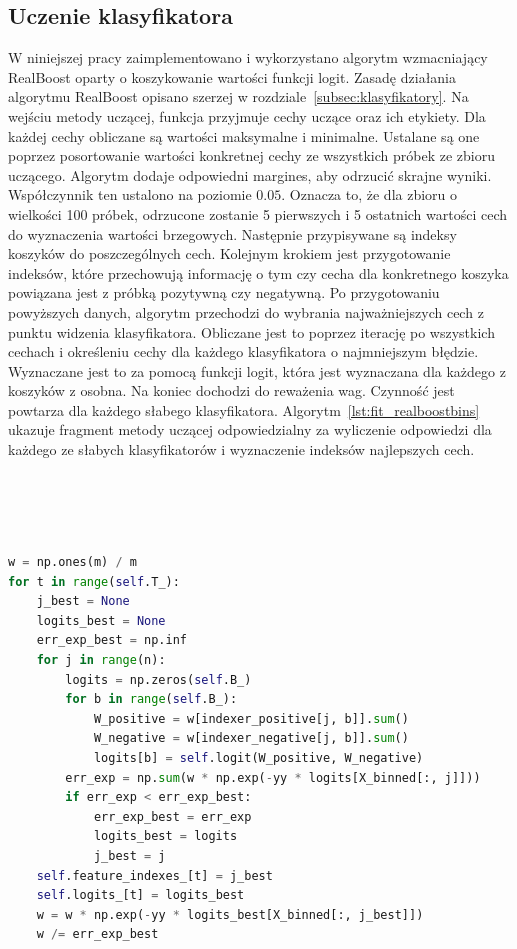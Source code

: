 \subsection{Uczenie klasyfikatora}
W niniejszej pracy zaimplementowano i wykorzystano algorytm wzmacniający RealBoost oparty o koszykowanie wartości funkcji logit.
Zasadę działania algorytmu RealBoost opisano szerzej w rozdziale~\ref{subsec:klasyfikatory}.
Na wejściu metody uczącej, funkcja przyjmuje cechy uczące oraz ich etykiety.
Dla każdej cechy obliczane są wartości maksymalne i minimalne.
Ustalane są one poprzez posortowanie wartości konkretnej cechy ze wszystkich próbek ze zbioru uczącego.
Algorytm dodaje odpowiedni margines, aby odrzucić skrajne wyniki.
Współczynnik ten ustalono na poziomie $0.05$.
Oznacza to, że dla zbioru o wielkości 100 próbek, odrzucone zostanie 5 pierwszych i 5 ostatnich wartości cech do wyznaczenia wartości brzegowych.
Następnie przypisywane są indeksy koszyków do poszczególnych cech.
Kolejnym krokiem jest przygotowanie indeksów, które przechowują informację o tym czy cecha dla konkretnego koszyka powiązana jest z próbką pozytywną czy negatywną.
Po przygotowaniu powyższych danych, algorytm przechodzi do wybrania najważniejszych cech z punktu widzenia klasyfikatora.
Obliczane jest to poprzez iterację po wszystkich cechach i określeniu cechy dla każdego klasyfikatora o najmniejszym błędzie.
Wyznaczane jest to za pomocą funkcji logit, która jest wyznaczana dla każdego z koszyków \linebreak z osobna.
Na koniec dochodzi do reważenia wag.
Czynność jest powtarza dla każdego słabego klasyfikatora.
Algorytm~\ref{lst:fit_realboostbins} ukazuje fragment metody uczącej odpowiedzialny za wyliczenie odpowiedzi dla każdego ze słabych klasyfikatorów i wyznaczenie indeksów najlepszych cech.\\\\\\\\\\
\begin{lstlisting}[language=Python, caption=Procedura ucząca klasyfikator RealBoostBins., label={lst:fit_realboostbins}]
w = np.ones(m) / m
for t in range(self.T_):
    j_best = None
    logits_best = None
    err_exp_best = np.inf
    for j in range(n):
        logits = np.zeros(self.B_)
        for b in range(self.B_):
            W_positive = w[indexer_positive[j, b]].sum()
            W_negative = w[indexer_negative[j, b]].sum()
            logits[b] = self.logit(W_positive, W_negative)
        err_exp = np.sum(w * np.exp(-yy * logits[X_binned[:, j]]))
        if err_exp < err_exp_best:
            err_exp_best = err_exp
            logits_best = logits
            j_best = j
    self.feature_indexes_[t] = j_best
    self.logits_[t] = logits_best
    w = w * np.exp(-yy * logits_best[X_binned[:, j_best]])
    w /= err_exp_best

\end{lstlisting}
